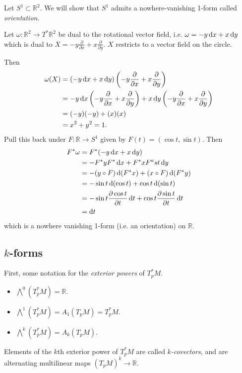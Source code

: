 \begin{xmpl}
Let $S^1 \subset \mathbb{R}^2$. We will show that $S^1$ admits a
nowhere-vanishing 1-form called \emph{orientation}.

Let $\omega : \mathbb{R}^2 \to T^\ast \mathbb{R}^2$ be dual to the
rotational vector field, i.e.
$\omega = -y \mathop{}\!\mathrm{d} x + x \mathop{}\!\mathrm{d} y$ which is dual to
$X = -y \frac{\partial}{\partial x} + x \frac{\partial}{\partial y}$.
$X$ restricts to a vector field on the circle.

Then
\begin{align*}
   \omega(X)
&= (-y \mathop{}\!\mathrm{d} x + x \mathop{}\!\mathrm{d} y)
     \left(
     - y \frac{\partial}{\partial x}
     + x \frac{\partial}{\partial y}
     \right) \\
&= - y \mathop{}\!\mathrm{d} x
   \left(
   - y \frac{\partial}{\partial x}
   + x \frac{\partial}{\partial y}
   \right)
   + x \mathop{}\!\mathrm{d} y
   \left(
   - y \frac{\partial}{\partial x}
   + x \frac{\partial}{\partial y}
   \right) \\
&= (-y)(-y) + (x)(x) \\
&= x^2 + y^2 = 1.
\end{align*}
Pull this back under $F: \mathbb{R} \to S^1$ given by
$F(t) = (\cos t, \sin t)$. Then
\begin{align*}
   F^\ast \omega
&= F^\ast(-y \dif x + x \dif y) \\
&= -F^\ast y F^\ast \dif x
 + F^\ast x F^ast \dif y \\
&= -(y \circ F) \dif (F^\ast x)
 + (x \circ F) \dif(F^\ast y) \\
&= -\sin t \dif (\cos t)
 + \cos t \dif (\sin t) \\
&= -\sin t
    \frac{\partial \cos t}{\partial t}
    \dif t
 + \cos t
    \frac{\partial \sin t}{\partial t}
    \dif t \\
&= \dif t
\end{align*}
which is a nowhere vanishing 1-form (i.e. an orientation) on $\mathbb{R}$.
\end{xmpl}

\subsection{$k$-forms}
First, some notation for the \emph{exterior powers} of $T_p^\ast M$.
\begin{itemize}
  \item{
    $\bigwedge^0(T_p^\ast M) = \mathbb{R}$.
  }
  \item{
    $\bigwedge^1(T_p^\ast M) = A_1(T_p M) = T_p^\ast M$.
  }
  \item{
    $\bigwedge^k(T_p^\ast M) = A_k(T_p M)$.
  }
\end{itemize}
Elements of the $k$th exterior power of $T_p^\ast M$ are called
\emph{$k$-covectors}, and are alternating multilinear maps
$(T_pM)^k \to \mathbb{R}$.
